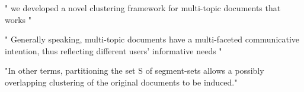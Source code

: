 " we developed a novel clustering framework for multi-topic documents that works "

" Generally speaking, multi-topic documents have a multi-faceted communicative intention, thus reflecting different users’ informative needs "


"In other terms, partitioning the set S of segment-sets allows a possibly overlapping clustering of the original documents to be induced."























